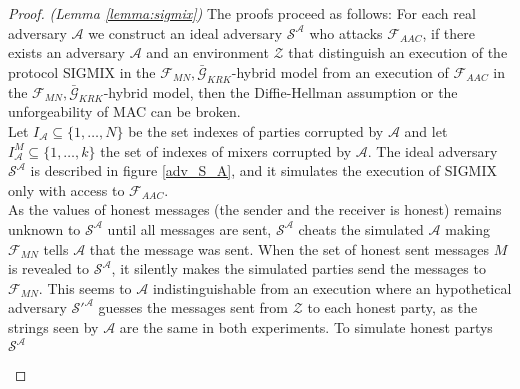 \documentclass{acm_proc_article-sp}
\begin{document}
\begin{proof}
\textit{(Lemma \ref{lemma:sigmix})}
The proofs proceed as follows: For each real adversary $\mathcal{A}$ we construct an ideal adversary
$\mathcal{S^A}$ who attacks $\mathcal{F}_{AAC}$,
if there exists an adversary $\mathcal{A}$ and an environment $\mathcal{Z}$ that distinguish an
execution of the protocol SIGMIX in the $\mathcal{F}_{MN}, \bar{\mathcal{G}}_{KRK}$-hybrid model
from an execution of $\mathcal{F}_{AAC}$ in the $\mathcal{F}_{MN}, \bar{\mathcal{G}}_{KRK}$-hybrid
model, then the Diffie-Hellman assumption or the unforgeability of MAC can be
broken.\\
Let $I_{\mathcal{A}} \subseteq \{1, \ldots, N\}$ be the set indexes of parties corrupted by $\mathcal{A}$
and let $I_{\mathcal{A}}^M \subseteq \{1, \ldots, k\}$ the set of indexes of mixers corrupted by $\mathcal{A}$.
The ideal adversary $\mathcal{S^A}$ is described in figure \ref{adv_S_A}, and it simulates
the execution of SIGMIX only with access to $\mathcal{F}_{AAC}$.\\
As the values of honest messages
(the sender and the receiver is honest) remains unknown to $\mathcal{S^A}$ until all
messages are sent, $\mathcal{S^A}$ cheats the simulated $\mathcal{A}$ making $\mathcal{F}_{MN}$ tells
$\mathcal{A}$ that the message was sent.
When the set of honest sent messages $M$ is revealed to $\mathcal{S^A}$, it
silently makes the simulated parties send the messages to $\mathcal{F}_{MN}$. This seems to $\mathcal{A}$
indistinguishable from an execution where an hypothetical adversary $\mathcal{S}'^{\mathcal{A}}$ guesses
the messages sent from $\mathcal{Z}$ to each honest party, as the strings seen by $\mathcal{A}$ are the
same in both experiments.
To simulate honest partys $\mathcal{S^A}$ 

\begin{figure}
\end{figure}
\end{proof}
\end{document}

